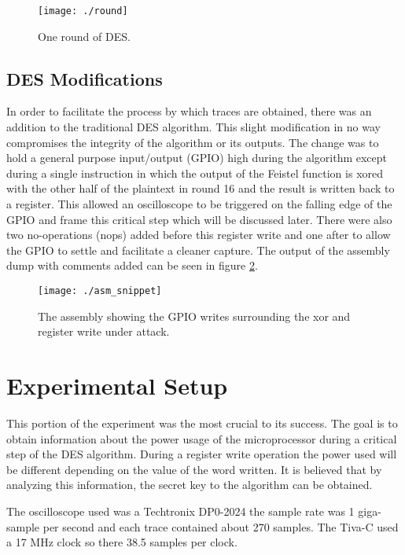 	\begin{figure}[h]
	\centering
	\texttt{[image: ./round]}
	\caption{One round of DES.}
	\label{fig:round}
	\end{figure}




\subsection{DES Modifications}
	In order to facilitate the process by which traces are obtained, there was an addition to the traditional DES algorithm.  This slight modification in no way compromises the integrity of the algorithm or its outputs.  The change was to hold a general purpose input/output (GPIO) high during the algorithm except during a single instruction in which the output of the Feistel function is xored with the other half of the plaintext in round 16 and the result is written back to a register.  This allowed an oscilloscope to be triggered on the falling edge of the GPIO and frame this critical step which will be discussed later.  There were also two no-operations (nops) added before this register write and one after to allow the GPIO to settle and facilitate a cleaner capture.  The output of the assembly dump with comments added can be seen in figure \ref{fig:asm_snippet}.
	
	\begin{figure}[h]
	\centering
	\texttt{[image: ./asm\_snippet]}
	\caption{The assembly showing the GPIO writes surrounding the xor and register write under attack.}
	\label{fig:asm_snippet}
	\end{figure}

	

\section{Experimental Setup} \label{sec::expr}
	This portion of the experiment was the most crucial to its success.  The goal is to obtain information about the power usage of the microprocessor during a critical step of the DES algorithm.  During a register write operation the power used will be different depending on the value of the word written.  It is believed that by analyzing this information, the secret key to the algorithm can be obtained.
	
	The oscilloscope used was a Techtronix DP0-2024 the sample rate was 1 giga-sample per second and each trace contained about 270 samples.  The Tiva-C used a 17 MHz clock so there 38.5 samples per clock.
	
